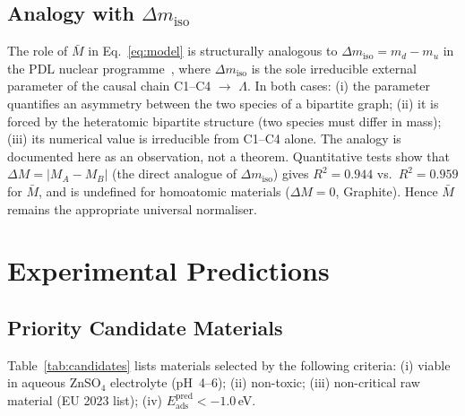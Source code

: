 \documentclass[11pt,a4paper]{article}
\newcommand{\Eads}{E_{\mathrm{ads}}}
\newcommand{\Mmoy}{\bar{M}}
\newcommand{\DeltaM}{\Delta M}
\begin{document}
\subsection{Analogy with \texorpdfstring{$\Delta m_{\mathrm{iso}}$}{Delta m (iso)}}

The role of $\Mmoy$ in Eq.~\eqref{eq:model} is structurally analogous to $\Delta m_{\mathrm{iso}} = m_d - m_u$ in the PDL nuclear programme~\cite{D43,D44,D55}, where $\Delta m_{\mathrm{iso}}$ is the sole irreducible external parameter of the causal chain C1--C4 $\to$ $\Lambda$. In both cases: (i) the parameter quantifies an asymmetry between the two species of a bipartite graph; (ii) it is forced by the heteratomic bipartite structure (two species must differ in mass); (iii) its numerical value is irreducible from C1--C4 alone. The analogy is documented here as an observation, not a theorem. Quantitative tests show that $\DeltaM = |M_A - M_B|$ (the direct analogue of $\Delta m_{\mathrm{iso}}$) gives $R^2 = 0.944$ vs.\ $R^2 = 0.959$ for $\Mmoy$, and is undefined for homoatomic materials ($\DeltaM = 0$, Graphite). Hence $\Mmoy$ remains the appropriate universal normaliser.

\section{Experimental Predictions}
\label{sec:predictions}

\subsection{Priority Candidate Materials}

Table~\ref{tab:candidates} lists materials selected by the following criteria: (i) viable in aqueous ZnSO$_4$ electrolyte (pH~4--6); (ii) non-toxic; (iii) non-critical raw material (EU 2023 list); (iv) $\Eads^{\mathrm{pred}} < -1.0$\,eV.
\end{document}
